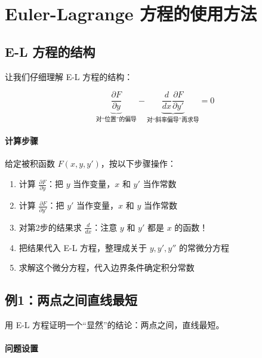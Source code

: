 \section{Euler-Lagrange 方程的使用方法}

\subsection{E-L 方程的结构}

让我们仔细理解 E-L 方程的结构：

\[
\underbrace{\frac{\partial F}{\partial y}}_{\text{对“位置”的偏导}} - \underbrace{\frac{d}{dx}\frac{\partial F}{\partial y'}}_{\text{对“斜率偏导”再求导}} = 0
\]

\paragraph{计算步骤}

给定被积函数 $F(x, y, y')$，按以下步骤操作：

\begin{enumerate}
    \item 计算 $\frac{\partial F}{\partial y}$：把 $y$ 当作变量，$x$ 和 $y'$ 当作常数
    
    \item 计算 $\frac{\partial F}{\partial y'}$：把 $y'$ 当作变量，$x$ 和 $y$ 当作常数
    
    \item 对第2步的结果求 $\frac{d}{dx}$：注意 $y$ 和 $y'$ 都是 $x$ 的函数！
    
    \item 把结果代入 E-L 方程，整理成关于 $y, y', y''$ 的常微分方程
    
    \item 求解这个微分方程，代入边界条件确定积分常数
\end{enumerate}

\subsection{例1：两点之间直线最短}

用 E-L 方程证明一个“显然”的结论：两点之间，直线最短。

\paragraph{问题设置}

